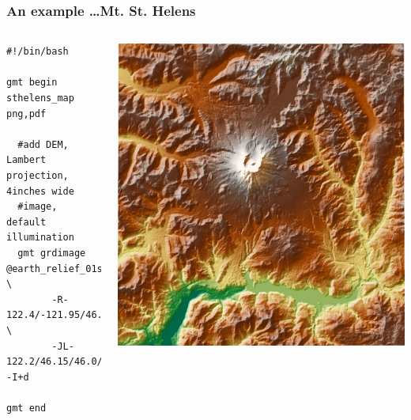 \documentclass[unknownkeysallowed]{beamer}
\begin{document}
\begin{frame}[fragile=singleslide]
\frametitle{An example \dots Mt. St. Helens}
	\begin{columns}
		\tiny{
		\begin{verbatim}
#!/bin/bash

gmt begin sthelens_map png,pdf

  #add DEM, Lambert projection, 4inches wide 
  #image, default illumination
  gmt grdimage @earth_relief_01s \
        -R-122.4/-121.95/46.0/46.33 \
        -JL-122.2/46.15/46.0/46.3/4i -I+d

gmt end		
		\end{verbatim}
}
		\begin{center}
				\includegraphics[width=\textwidth]{../figures/gmt_sthelens_map_01.png}
		\end{center}
	\end{columns}
\end{frame}
\end{document}
